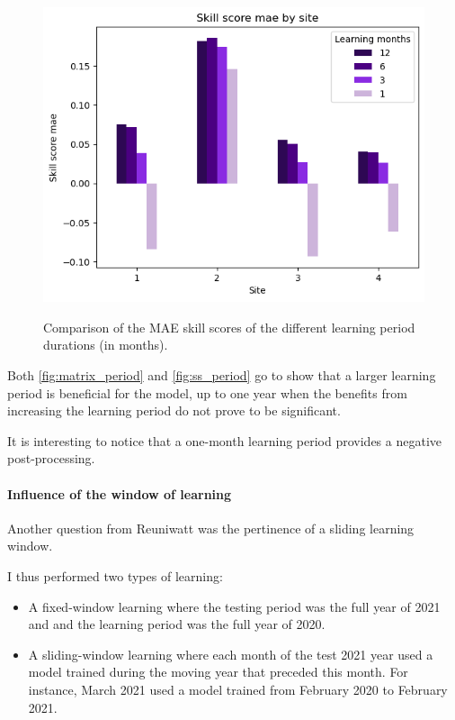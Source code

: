 \begin{figure}[htb!]
    \centering
    \includegraphics[width=\columnwidth]{figures/first_study/comp_learning_period_mae_svr.png}
    \label{fig:ss_period}
\caption{Comparison of the MAE skill scores of the different learning period durations (in months).}
\end{figure}

Both \autoref{fig:matrix_period} and \autoref{fig:ss_period} go to show that a larger learning period is beneficial for the model, up to one year when 
the benefits from increasing the learning period do not prove to be significant.

It is interesting to notice that a one-month learning period provides a negative post-processing.
\paragraph{Influence of the window of learning}
 
Another question from Reuniwatt was the pertinence of a sliding learning window.

I thus performed two types of learning:
\begin{itemize}
    \item A fixed-window learning where the testing period was the full year of 2021 and and the learning period was the full year of 2020.
    \item A sliding-window learning where each month of the test 2021 year used a model trained during the moving year that preceded this month. For instance, March 2021 used a model trained from February 2020 to February 2021.
\end{itemize}

